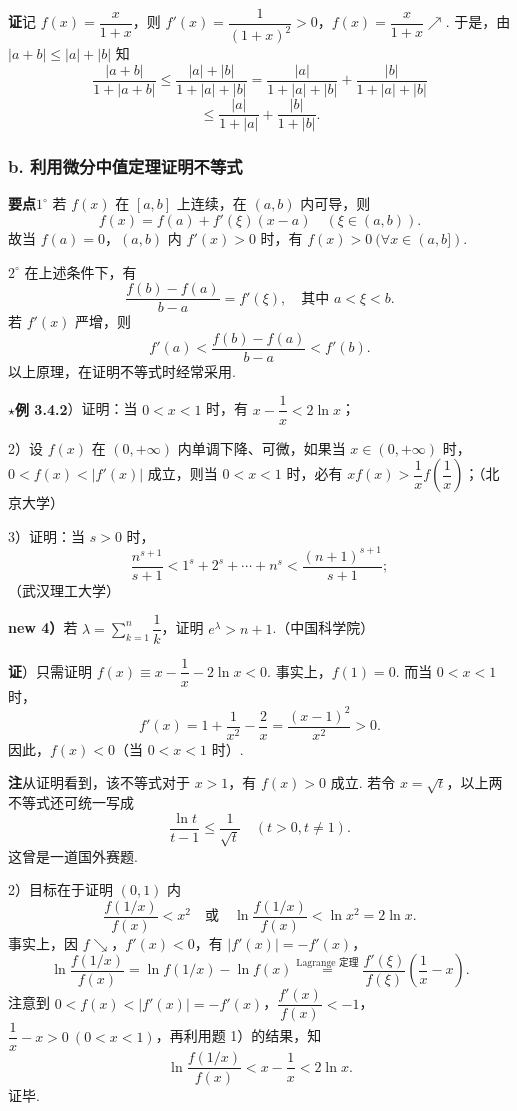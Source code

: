 \documentclass[UTF8, 12pt, fontset=fandol, oneside]{ctexart}
\begin{document}
\noindent\textbf{证}\quad 记 $f(x)=\dfrac{x}{1+x}$，则 $f'(x)=\dfrac1{(1+x)^2}>0$，$f(x)=\dfrac{x}{1+x}\nearrow$. 于是，由 $|a+b|\le |a|+|b|$ 知
\[
  \frac{|a+b|}{1+|a+b|}\le\frac{|a|+|b|}{1+|a|+|b|}
  =\frac{|a|}{1+|a|+|b|}+\frac{|b|}{1+|a|+|b|}
\]
\[
  \le \frac{|a|}{1+|a|}+\frac{|b|}{1+|b|}.
\]

\subsubsection*{b. 利用微分中值定理证明不等式}

\noindent\textbf{要点}\quad $1^\circ$ 若 $f(x)$ 在 $[a,b]$ 上连续，在 $(a,b)$ 内可导，则
\[
  f(x)=f(a)+f'(\xi)(x-a)\quad(\xi\in(a,b)).
\]
故当 $f(a)=0$，$(a,b)$ 内 $f'(x)>0$ 时，有 $f(x)>0\ (\forall x\in(a,b])$.

$2^\circ$ 在上述条件下，有
\[
  \frac{f(b)-f(a)}{b-a}=f'(\xi),\quad \text{其中 }a<\xi<b.
\]
若 $f'(x)$ 严增，则
\[
  f'(a)<\frac{f(b)-f(a)}{b-a}<f'(b).
\]
以上原理，在证明不等式时经常采用.

\noindent\textbf{$\star$例 3.4.2}）证明：当 $0<x<1$ 时，有 $x-\dfrac1x<2\ln x$；

2）设 $f(x)$ 在 $(0,+\infty)$ 内单调下降、可微，如果当 $x\in(0,+\infty)$ 时，$0<f(x)<|f'(x)|$ 成立，则当 $0<x<1$ 时，必有 $xf(x)>\dfrac1x f\left(\dfrac1x\right)$；（北京大学）

3）证明：当 $s>0$ 时，
\[
  \frac{n^{s+1}}{s+1}<1^s+2^s+\cdots+n^s<\frac{(n+1)^{s+1}}{s+1};
\]
（武汉理工大学）

\noindent\textbf{new 4）}\quad 若 $\lambda=\sum\limits_{k=1}^n\dfrac1k$，证明 $e^\lambda>n+1$.（中国科学院）

\noindent\textbf{证}）只需证明 $f(x)\equiv x-\dfrac1x-2\ln x<0$. 事实上，$f(1)=0$. 而当 $0<x<1$ 时，
\[
  f'(x)=1+\frac1{x^2}-\frac2x=\frac{(x-1)^2}{x^2}>0.
\]
因此，$f(x)<0$（当 $0<x<1$ 时）.

\noindent\textbf{注}\quad 从证明看到，该不等式对于 $x>1$，有 $f(x)>0$ 成立. 若令 $x=\sqrt t$，以上两不等式还可统一写成
\[
  \frac{\ln t}{t-1}\le \frac1{\sqrt t}\quad(t>0,t\ne1).
\]
这曾是一道国外赛题.

2）目标在于证明 $(0,1)$ 内
\[
  \frac{f(1/x)}{f(x)}<x^2\quad\text{或}\quad
  \ln\frac{f(1/x)}{f(x)}<\ln x^2=2\ln x.
\]
事实上，因 $f\searrow$，$f'(x)<0$，有 $|f'(x)|=-f'(x)$，
\[
  \ln\frac{f(1/x)}{f(x)}
  =\ln f(1/x)-\ln f(x)
  \overset{\text{Lagrange 定理}}{=}
  \frac{f'(\xi)}{f(\xi)}\left(\frac1x-x\right).
\]
注意到 $0<f(x)<|f'(x)|=-f'(x)$，$\dfrac{f'(x)}{f(x)}<-1$，$\dfrac1x-x>0\ (0<x<1)$，再利用题 1）的结果，知
\[
  \ln\frac{f(1/x)}{f(x)}<x-\frac1x<2\ln x.
\]
证毕.
\end{document}
